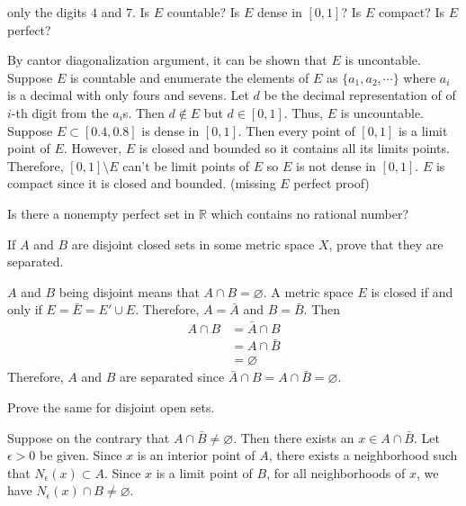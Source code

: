 \begin{exercise}
  only the digits \(4\) and \(7\).
  Is \(E\) countable?
  Is \(E\) dense in \([0, 1]\)?
  Is \(E\) compact?
  Is \(E\) perfect?
  \par\smallskip
  By cantor diagonalization argument, it can be shown that \(E\) is uncontable.
  Suppose \(E\) is countable and enumerate the elements of \(E\) as
  \(\{a_1,a_2,\cdots\}\) where \(a_i\) is a decimal with only fours and sevens.
  Let \(d\) be the decimal representation of of \(i\)-th digit from the
  \(a_i\)s.
  Then \(d\not\in E\) but \(d\in[0,1]\).
  Thus, \(E\) is uncountable.
  Suppose \(E\subset [0.4,0.8]\) is dense in \([0,1]\).
  Then every point of \([0,1]\) is a limit point of \(E\).
  However, \(E\) is closed and bounded so it contains all its limits points.
  Therefore, \([0,1]\setminus E\) can't be limit points of \(E\) so \(E\)
  is not dense in \([0,1]\).
  \(E\) is compact since it is closed and bounded.
  (missing \(E\) perfect proof)
\item
  Is there a nonempty perfect set in \(\mathbb{R}\) which contains no rational
  number?
\item
  \begin{exercise}[label = (\alph*), ref = \arabic{exercisei} (\alph*)]
  \item
    If \(A\) and \(B\) are disjoint closed sets in some metric space \(X\),
    prove that they are separated.
    \par\smallskip
    \(A\) and \(B\) being disjoint means that \(A\cap B = \varnothing\).
    A metric space \(E\) is closed if and only if \(E = \bar{E} = E'\cup E\).
    Therefore, \(A = \bar{A}\) and \(B = \bar{B}\).
    Then
    \begin{align*}
      A\cap B & = \bar{A}\cap B\\
              & = A\cap\bar{B}\\
              & = \varnothing
    \end{align*}
    Therefore, \(A\) and \(B\) are separated since
    \(\bar{A}\cap B = A\cap\bar{B} = \varnothing\).
  \item
    \label{2.19b}
    Prove the same for disjoint open sets.
    \par\smallskip
    Suppose on the contrary that \(A\cap\bar{B}\neq\varnothing\).
    Then there exists an \(x\in A\cap\bar{B}\).
    Let \(\epsilon > 0\) be given.
    Since \(x\) is an interior point of \(A\), there exists a neighborhood such
    that \(N_{\epsilon}(x)\subset A\).
    Since \(x\) is a limit point of \(B\), for all neighborhoods of \(x\), we
    have \(N_{\epsilon}(x)\cap B\neq\varnothing\).

\end{exercise}
\end{exercise}
